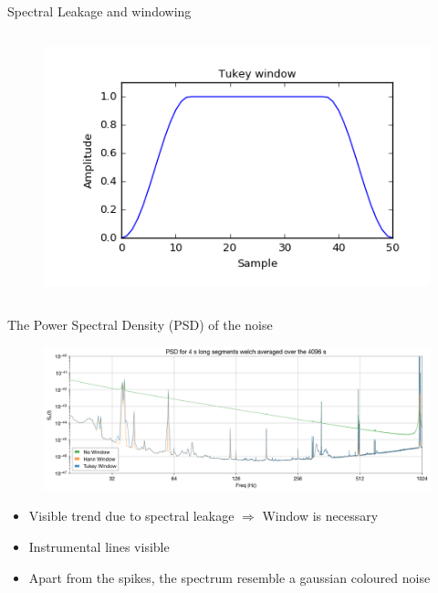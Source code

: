 \documentclass[
10pt,
aspectratio=169,
]{beamer}
\begin{document}
\begin{frame}{Spectral Leakage and windowing}
\begin{columns}
\begin{figure}
            \includegraphics[width=\columnwidth]{scipy-signal-tukey-1_00.png}
        \end{figure}
    \end{columns}
\end{frame}
\begin{frame}{The Power Spectral Density (PSD) of the noise}

\begin{figure}
    \centering
    \includegraphics[width=\textwidth]{psd_def.png}
\end{figure}
 \begin{itemize}
     \item Visible trend due to spectral leakage $\Rightarrow$ Window is necessary
     \item Instrumental lines visible
     \item Apart from the spikes, the spectrum resemble a gaussian coloured noise
 \end{itemize}
\end{frame}
\end{document}
